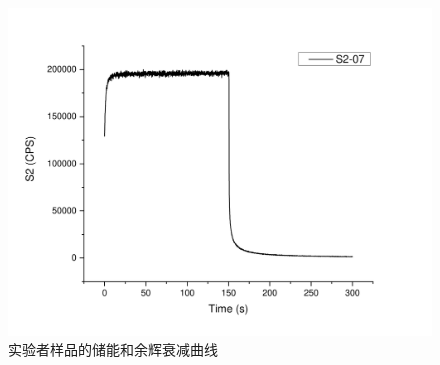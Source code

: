 \documentclass[a4paper,zihao=5,UTF8]{ctexart}
\begin{document}
	\begin{figure}[htbp]
		\centering
		\includegraphics[scale=0.50]{S2residual.pdf}
		\caption{实验者样品的储能和余辉衰减曲线}
		\label{S2 fluorescence residual}
	\end{figure}
\end{document}

